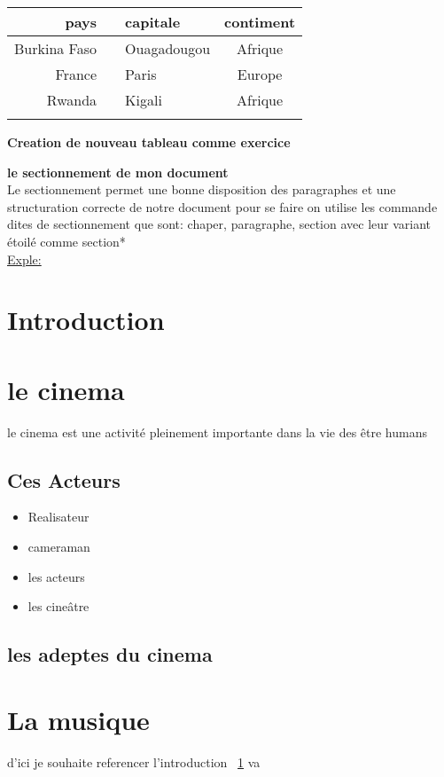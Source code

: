 \documentclass{article}
\begin{document}
	\begin{tabular}{|r|l|l|c|}
		\hline
		pays & & capitale & contiment\\
		\hline
		Burkina Faso & & Ouagadougou & Afrique\\
		\hline
		France & & Paris & Europe\\
		\hline
		Rwanda & & Kigali & Afrique\\
		\hline
 & & & \\
 \hline
	\end{tabular}
\begin{center}
	\textbf{Creation de nouveau tableau comme exercice}
\end{center}
\textbf{le sectionnement de mon document} \\
Le sectionnement permet une bonne disposition des paragraphes et une structuration correcte de notre document pour se faire on utilise les commande dites de sectionnement que sont: chaper{}, paragraphe{}, section{} avec leur variant \'etoil\'e comme section*{}
\\
\underline{Exple: }\\ 
\section{Introduction}
\label{intro}
\section{le cinema}
le cinema est une activit\'e pleinement importante dans la vie des \^etre humans 
\subsection{Ces Acteurs}
\begin{itemize}
	\item Realisateur
	\item cameraman
	\item les acteurs
	\item les cine\^{a}tre 
\end{itemize}

\subsection{les adeptes du cinema }
\section{La musique}
d'ici je souhaite referencer l'introduction ~\ref{intro} va
\end{document}
